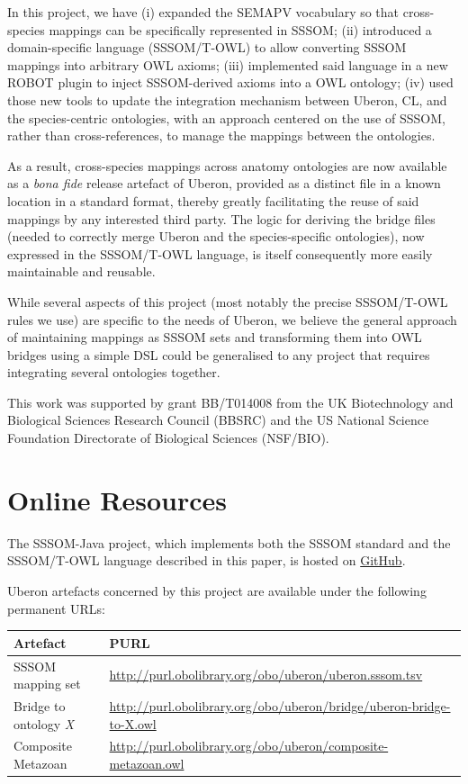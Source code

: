 \documentclass{ceurart}
\begin{document}
In this project, we have (i) expanded the SEMAPV vocabulary so that
cross-species mappings can be specifically represented in SSSOM; (ii)
introduced a domain-specific language (SSSOM/T-OWL) to allow converting
SSSOM mappings into arbitrary OWL axioms; (iii) implemented said
language in a new ROBOT plugin to inject SSSOM-derived axioms into a OWL
ontology; (iv) used those new tools to update the integration mechanism
between Uberon, CL, and the species-centric ontologies, with an approach
centered on the use of SSSOM, rather than cross-references, to manage
the mappings between the ontologies.

As a result, cross-species mappings across anatomy ontologies are now
available as a \emph{bona fide} release artefact of Uberon, provided as
a distinct file in a known location in a standard format, thereby
greatly facilitating the reuse of said mappings by any interested third
party. The logic for deriving the bridge files (needed to correctly
merge Uberon and the species-specific ontologies), now expressed in the
SSSOM/T-OWL language, is itself consequently more easily maintainable
and reusable.

While several aspects of this project (most notably the precise
SSSOM/T-OWL rules we use) are specific to the needs of Uberon, we
believe the general approach of maintaining mappings as SSSOM sets and
transforming them into OWL bridges using a simple DSL could be
generalised to any project that requires integrating several ontologies
together.

\begin{acknowledgments}
This work was supported by grant BB/T014008 from the UK Biotechnology
and Biological Sciences Research Council (BBSRC) and the US National
Science Foundation Directorate of Biological Sciences (NSF/BIO).
\end{acknowledgments}



\appendix

\section{Online Resources}

The SSSOM-Java project, which implements both the SSSOM standard and the
SSSOM/T-OWL language described in this paper, is hosted on
\href{https://github.com/gouttegd/sssom-java/}{GitHub}.

Uberon artefacts concerned by this project are available under the
following permanent URLs:

\begin{tabular}{ll}
\hline
Artefact & PURL\\
\hline
SSSOM mapping set & \url{http://purl.obolibrary.org/obo/uberon/uberon.sssom.tsv}\\
Bridge to ontology \emph{X} & \url{http://purl.obolibrary.org/obo/uberon/bridge/uberon-bridge-to-X.owl}\\
Composite Metazoan & \url{http://purl.obolibrary.org/obo/uberon/composite-metazoan.owl}\\
\hline
\end{tabular}
\end{document}
